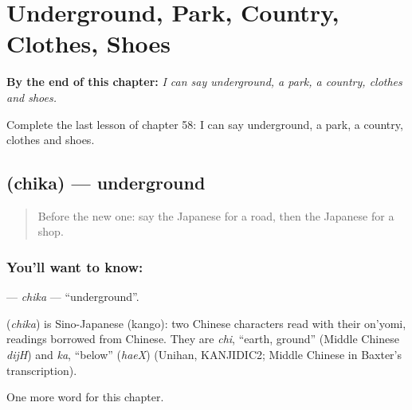 
\chapter{Underground, Park, Country, Clothes, Shoes}
\label{ch:ja-underground-park-country-clothes-shoes}

\begin{chapteropening}
\textbf{By the end of this chapter:} \emph{I can say underground, a park, a country, clothes and shoes.}

Complete the last lesson of chapter 58: I can say underground, a park, a country, clothes and shoes.
\end{chapteropening}

\section[\texorpdfstring{\ja{ちか} (chika)}{ちか (chika)}]{ (chika) — underground}

\label{lesson:JA-C58-chika}



\begin{quote}
Before the new one: say the Japanese for a road, then the Japanese for a shop.
\end{quote}

\subsection*{You'll want to know: }
\textbf{} — \emph{chika} — \textquotedblleft{}underground\textquotedblright{}.

\begin{cousinweb}
\textbf{} (\emph{chika}) is Sino-Japanese (kango): two Chinese characters read with their on'yomi, readings borrowed from Chinese. They are \emph{chi}, \textquotedblleft{}earth, ground\textquotedblright{} (Middle Chinese \emph{dijH}) and \emph{ka}, \textquotedblleft{}below\textquotedblright{} (\emph{haeX}) (Unihan, KANJIDIC2; Middle Chinese in Baxter's transcription).
\end{cousinweb}

\begin{grammarlens}[title={What you've built}]
One more word for this chapter.
\end{grammarlens}

